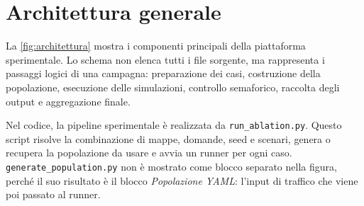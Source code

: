 \documentclass[12pt,a4paper,oneside]{report}
\numberwithin{equation}{chapter}
\begin{document}
\section{Architettura generale}

La \cref{fig:architettura} mostra i componenti principali della piattaforma
sperimentale. Lo schema non elenca tutti i file sorgente, ma rappresenta i
passaggi logici di una campagna: preparazione dei casi, costruzione della
popolazione, esecuzione delle simulazioni, controllo semaforico, raccolta degli
output e aggregazione finale.

Nel codice, la pipeline sperimentale è realizzata da
\texttt{run\_ablation.py}. Questo script risolve la combinazione di mappe,
domande, seed e scenari, genera o recupera la popolazione da usare e avvia un
runner per ogni caso. \texttt{generate\_population.py} non è mostrato come
blocco separato nella figura, perché il suo risultato è il blocco
\emph{Popolazione YAML}: l'input di traffico che viene poi passato al runner.
\end{document}
